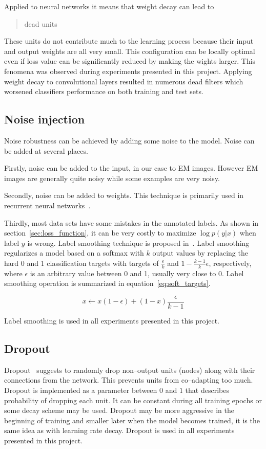 \documentclass[a4paper, 11pt, table]{article}
\begin{document}
Applied to neural networks it means that weight decay can lead to \blockquote{dead units}. These units do not contribute much to the learning process because their input and output weights are all very small. This configuration can be locally optimal even if loss value can be significantly reduced by making the wights larger. This fenomena was observed during experiments presented in this project. Applying weight decay to convolutional layers resulted in numerous dead filters which worsened classifiers performance on both training and test sets.

\subsection{Noise injection}
Noise robustness can be achieved by adding some noise to the model. Noise can be added at several places. 

Firstly, noise can be added to the input, in our case to EM images. However EM images are generally quite noisy while some examples are very noisy. 

Secondly, noise can be added to weights. This technique is primarily used in recurrent neural networks~\cite{pmid18263536}. 

Thirdly, most data sets have some mistakes in the annotated labels. As shown in section~\ref{sec:loss_function}, it can be very costly to maximize $\log p(y|x)$ when label $y$ is wrong. Label smoothing technique is proposed in~\cite{dl_book}. Label smoothing regularizes a model based on a softmax with $k$ output values by replacing the hard 0 and 1 classification targets with targets of $\frac{\epsilon}{k}$ and $1 - \frac{k-1}{k}\epsilon$, respectively, where $\epsilon$ is an arbitrary value between 0 and 1, usually very close to 0. Label smoothing operation is summarized in equation~\ref{eq:soft_targets}.

\begin{equation}
\label{eq:soft_targets}
x \leftarrow x \left( 1 - \epsilon \right) + \left(1 - x\right) \frac{\epsilon}{k - 1}
\end{equation}

Label smoothing is used in all experiments presented in this project.

\subsection{Dropout}
\label{sec:dropout}
Dropout~\cite{JMLR:v15:srivastava14a} suggests to randomly drop non--output units (nodes) along with their connections from the network. This prevents units from co--adapting too much. Dropout is implemented as a parameter between $0$ and $1$ that describes probability of dropping each unit. It can be constant during all training epochs or some decay scheme may be used. Dropout may be more aggressive in the beginning of training and smaller later when the model becomes trained, it is the same idea as with learning rate decay. Dropout is used in all experiments presented in this project.
\end{document}

